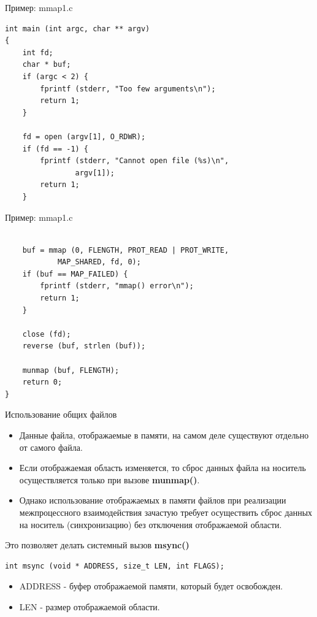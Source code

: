 \documentclass[xcolor=table]{beamer}
\begin{document}
\begin{frame}[fragile]{Пример: mmap1.c}
	\linespread{0.8}
	\begin{verbatim}
int main (int argc, char ** argv)
{
	int fd;
	char * buf;
	if (argc < 2) {
		fprintf (stderr, "Too few arguments\n");
		return 1;
	}

	fd = open (argv[1], O_RDWR);
	if (fd == -1) {
		fprintf (stderr, "Cannot open file (%s)\n",
				argv[1]);
		return 1;
	}
	\end{verbatim}
\end{frame}

\begin{frame}[fragile]{Пример: mmap1.c}
	\linespread{0.8}
	\begin{verbatim}

	buf = mmap (0, FLENGTH, PROT_READ | PROT_WRITE,
			MAP_SHARED, fd, 0);
	if (buf == MAP_FAILED) {
		fprintf (stderr, "mmap() error\n");
		return 1;
	}

	close (fd);
	reverse (buf, strlen (buf));

	munmap (buf, FLENGTH);
	return 0;
}	
	\end{verbatim}
\end{frame}

\begin{frame}[fragile]{Использование общих файлов}
	\begin{itemize}
		\item Данные файла, отображаемые в памяти, на самом деле существуют отдельно от самого файла. 
		\item Если отображаемая область изменяется, то сброс данных файла на носитель осуществляется только при вызове \textbf{munmap()}. 
		\item Однако использование отображаемых в памяти файлов при реализации межпроцессного взаимодействия зачастую требует осуществить сброс данных на носитель (синхронизацию) без отключения отображаемой области.
\end{itemize}
	Это позволяет делать системный вызов \textbf{msync()}
\begin{verbatim}
int msync (void * ADDRESS, size_t LEN, int FLAGS);
\end{verbatim}
	\begin{itemize}
	\item ADDRESS - буфер отображаемой памяти, который будет освобожден.
	\item LEN - размер отображаемой области.
	\end{itemize}
\end{frame}
\end{document}
